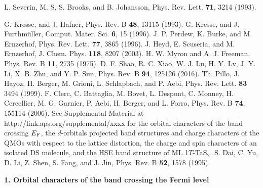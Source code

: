 \documentclass[aps,prl,twocolumn,showpacs,byrevtex]{revtex4}
\begin{document}
\begin{thebibliography}{99}
 L. Severin, M. S. S. Brooks, and B. Johansson, Phys. Rev. Lett. {\bf 71}, 3214 (1993).

 G. Kresse, and J. Hafner, Phys. Rev. B {\bf 48}, 13115 (1993).
 G. Kresse, and J. Furthm\"uller, Comput. Mater. Sci. {\bf 6}, 15 (1996).
 J. P. Perdew, K. Burke, and M. Ernzerhof, Phys. Rev. Lett. {\bf 77}, 3865 (1996).
 J. Heyd, E. Scuseria, and M. Ernzerhof, J. Chem. Phys. {\bf 118}, 8207 (2003).
 H. W. Myron and A. J. Freeman, Phys. Rev. B {\bf 11}, 2735 (1975).
 D. F. Shao, R. C. Xiao, W. J. Lu, H. Y. Lv, J. Y. Li, X. B. Zhu, and Y. P. Sun, Phys. Rev. B {\bf 94}, 125126 (2016).
 Th. Pillo, J. Hayoz, H. Berger, M. Grioni, L. Schlapbach, and P. Aebi, Phys. Rev. Lett. {\bf 83} 3494 (1999).
 F. Clerc, C. Battaglia, M. Bovet, L. Despont, C. Monney, H. Cercellier, M. G. Garnier, P. Aebi, H. Berger, and L. Forro, Phys. Rev. B {\bf 74}, 155114 (2006).
 See Supplemental Material at http://link.aps.org/supplemental/xxxx for the orbital characters of the band crossing $E_{\rm F}$, the $d$-orbitals projected band structures and charge characters of the QMOs with respect to the lattice distortion, the charge and spin characters of an isolated DS molecule, and the HSE band structure of ML 1$T$-TaS$_2$.
 S. Dai, C. Yu, D. Li, Z. Shen, S. Fang, and J. Jin, Phys. Rev. B {\bf 52}, 1578 (1995).

\end{thebibliography}


\widetext
\clearpage

\vspace{2.4cm}

\vspace{0.8cm}


\makeatletter
\renewcommand{\fnum@figure}{\figurename~S\thefigure}
\renewcommand{\fnum@table}{\tablename~S\thetable}
\setcounter{figure}{0}
\makeatother

\vspace{1.4cm}
{\bf \large 1. Orbital characters of the band crossing the Fermi level}
\end{document}
